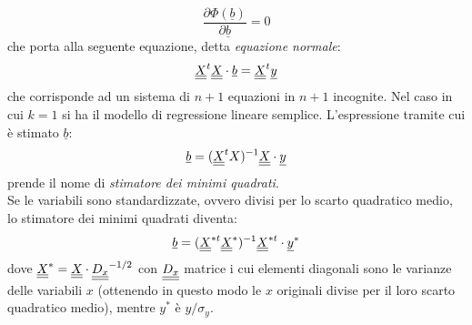 \begin{equation}
\frac{\partial \Phi(\underline{b})}{\partial \underline{b}} = 0
\end{equation}
che porta alla seguente equazione, detta \textit{equazione normale}:
\begin{equation}
\underline{\underline{X}}^t \underline{\underline{X}} \cdot \underline{b} = \underline{\underline{X}}^t \underline{y}
\end{equation}
che corrisponde ad un sistema di $n+1$ equazioni in $n+1$ incognite. Nel caso in cui $k = 1$ si ha il modello di regressione lineare semplice. L'espressione tramite cui è stimato $\underline{b}$:
\begin{equation}
\underline{b} = (\underline{\underline{X}}^t X)^{-1} \underline{\underline{X}} \cdot \underline{y}
\end{equation}
prende il nome di \textit{stimatore dei minimi quadrati}.\\
Se le variabili sono standardizzate, ovvero divisi per lo scarto quadratico medio, lo stimatore dei minimi quadrati diventa:
\begin{equation}
\underline{b} = (\underline{\underline{X}}^{*t} \underline{\underline{X}}^*)^{-1} \underline{\underline{X}}^{*t} \cdot \underline{y}^*
\end{equation}
dove $\underline{\underline{X}}^* = \underline{\underline{X}} \cdot \underline{\underline{D_x}}^{-1/2}$ con $\underline{\underline{D_x}}$ matrice i cui elementi diagonali sono le varianze delle variabili $x$ (ottenendo in questo modo le $x$ originali divise per il loro scarto quadratico medio), mentre $y^*$ è $y/\sigma_y$.


